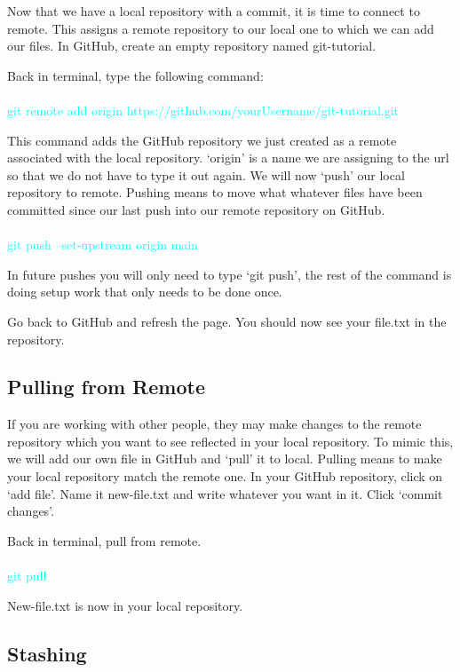 \documentclass[10pt,twocolumn]{article}
\begin{document}
Now that we have a local repository with a commit, it is time to connect to remote. This assigns a remote repository to our local one to which we can add our files. In GitHub, create an empty repository named git-tutorial. 

Back in terminal, type the following command:\\\\
\textcolor{cyan}{
git remote add origin https://github.com/yourUsername/git-tutorial.git\\
}

This command adds the GitHub repository we just created as a remote associated with the local repository. ‘origin’ is a name we are assigning to the url so that we do not have to type it out again. We will now ‘push’ our local repository to remote. Pushing means to move what whatever files have been committed since our last push into our remote repository on GitHub. \\\\
\textcolor{cyan}{
git push --set-upstream origin main\\
}

In future pushes you will only need to type ‘git push’, the rest of the command is doing setup work that only needs to be done once. 

Go back to GitHub and refresh the page. You should now see your file.txt in the repository. 


\subsection{Pulling from Remote}

If you are working with other people, they may make changes to the remote repository which you want to see reflected in your local repository. To mimic this, we will add our own file in GitHub and ‘pull’ it to local. Pulling means to make your local repository match the remote one. In your GitHub repository, click on ‘add file’. Name it new-file.txt and write whatever you want in it. Click ‘commit changes’.

Back in terminal, pull from remote.\\\\
\textcolor{cyan}{
git pull\\
}

New-file.txt is now in your local repository.


\subsection{Stashing}
\end{document}

